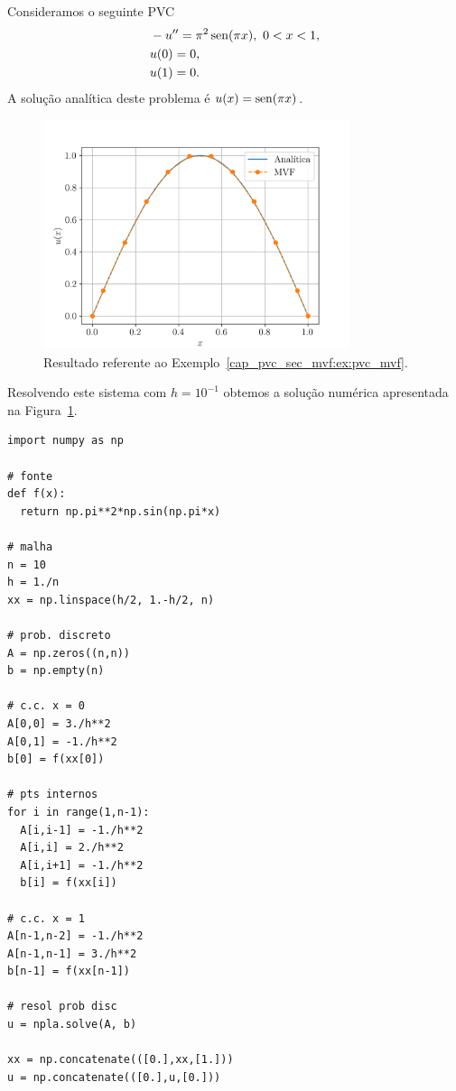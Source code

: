 \begin{ex}\label{cap_pvc_sec_mvf:ex:pvc_mvf}
  Consideramos o seguinte PVC
  \begin{align}
    &-u'' = \pi^2\operatorname{sen}(\pi x), ~0 < x < 1,\\
    &u(0) = 0,\\
    &u(1) = 0.
  \end{align}
  A solução analítica deste problema é $u(x) = \operatorname{sen}(\pi x)$.
  
  \begin{figure}[h!]
    \centering
    \includegraphics[width=0.8\textwidth]{./cap_pvc/dados/fig_mvf/fig}
    \caption{Resultado referente ao Exemplo~\ref{cap_pvc_sec_mvf:ex:pvc_mvf}.}
    \label{cap_pvc_sec_mvf:fig:ex_pvc_mvf}
  \end{figure}

  Resolvendo este sistema com $h=10^{-1}$ obtemos a solução numérica apresentada na Figura~\ref{cap_pvc_sec_mvf:fig:ex_pvc_mvf}.

\begin{lstlisting}[caption=pvc\_mvf.py]
import numpy as np

# fonte
def f(x):
  return np.pi**2*np.sin(np.pi*x)

# malha
n = 10
h = 1./n
xx = np.linspace(h/2, 1.-h/2, n)

# prob. discreto
A = np.zeros((n,n))
b = np.empty(n)

# c.c. x = 0
A[0,0] = 3./h**2
A[0,1] = -1./h**2
b[0] = f(xx[0])

# pts internos
for i in range(1,n-1):
  A[i,i-1] = -1./h**2
  A[i,i] = 2./h**2
  A[i,i+1] = -1./h**2
  b[i] = f(xx[i])

# c.c. x = 1
A[n-1,n-2] = -1./h**2
A[n-1,n-1] = 3./h**2
b[n-1] = f(xx[n-1])

# resol prob disc
u = npla.solve(A, b)

xx = np.concatenate(([0.],xx,[1.]))
u = np.concatenate(([0.],u,[0.]))
\end{lstlisting}
\end{ex}

